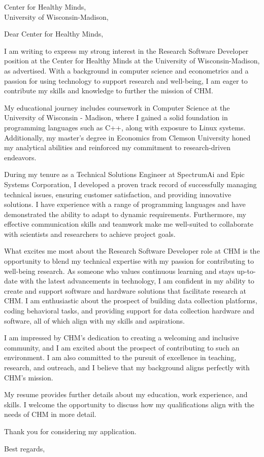 \documentclass[a4paper, 10pt]{letter}
\begin{document}
\begin{letter}
{
    Center for Healthy Minds,\\
    University of Wisconsin-Madison,\\
}
\opening{Dear Center for Healthy Minds,}

I am writing to express my strong interest in the Research Software Developer position at the Center for Healthy Minds at the University of Wisconsin-Madison, as advertised. With a background in computer science and econometrics and a passion for using technology to support research and well-being, I am eager to contribute my skills and knowledge to further the mission of CHM.

My educational journey includes coursework in Computer Science at the University of Wisconsin - Madison, where I gained a solid foundation in programming languages such as C++, along with exposure to Linux systems. Additionally, my master's degree in Economics from Clemson University honed my analytical abilities and reinforced my commitment to research-driven endeavors.

During my tenure as a Technical Solutions Engineer at SpectrumAi and Epic Systems Corporation, I developed a proven track record of successfully managing technical issues, ensuring customer satisfaction, and providing innovative solutions. I have experience with a range of programming languages and have demonstrated the ability to adapt to dynamic requirements. Furthermore, my effective communication skills and teamwork make me well-suited to collaborate with scientists and researchers to achieve project goals.

What excites me most about the Research Software Developer role at CHM is the opportunity to blend my technical expertise with my passion for contributing to well-being research. As someone who values continuous learning and stays up-to-date with the latest advancements in technology, I am confident in my ability to create and support software and hardware solutions that facilitate research at CHM. I am enthusiastic about the prospect of building data collection platforms, coding behavioral tasks, and providing support for data collection hardware and software, all of which align with my skills and aspirations.

I am impressed by CHM's dedication to creating a welcoming and inclusive community, and I am excited about the prospect of contributing to such an environment. I am also committed to the pursuit of excellence in teaching, research, and outreach, and I believe that my background aligns perfectly with CHM's mission.

My resume provides further details about my education, work experience, and skills. I welcome the opportunity to discuss how my qualifications align with the needs of CHM in more detail.

Thank you for considering my application.

\closing{Best regards,}

\end{letter}
\end{document}
